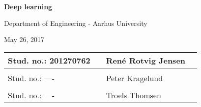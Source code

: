 
\centerline{\Huge\bfseries\color{ThemeColor} Deep learning}

\vspace{5em}
\centerline{\large\bfseries\color{BlackColor}}
\vspace{0.5em}
\centerline{\large\color{BlackColor}Department of Engineering - Aarhus University}

\vspace{0.5em}
\centerline{\large\color{BlackColor} May 26, 2017}



\vspace{25em}

\begin{center}
	\centerline{\large\color{BlackColor} }
	\vspace{5em}
   \begin{tabular}{ l p{3cm} l l }
    Stud. no.: 201270762 && René Rotvig Jensen & \\\hline
	& & \\
	Stud. no.: ---- && Peter Kragelund & \\\hline
	& & \\
	Stud. no.: ---- && Troels Thomsen & \\\hline
   \end{tabular}
\end{center}
\thispagestyle{empty} %
\restoregeometry

